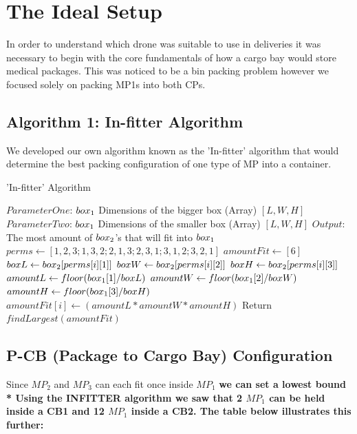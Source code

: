\documentclass[a4paper,12pt]{article}
\begin{document}
\section{The Ideal Setup}

In order to understand which drone was suitable to use in deliveries it was necessary to begin with the core fundamentals
of how a cargo bay would store medical packages. This was noticed to be a bin packing problem however we focused solely on packing MP1s into both CPs.

\subsection{Algorithm 1: In-fitter Algorithm}
We developed our own algorithm known as the 'In-fitter' algorithm that would determine the best packing configuration of one type of MP into a container.

\begin{algorithm}
  \caption{'In-fitter' Algorithm }
  \label{array-sum}
  \begin{algorithmic}[1]
    \State $ParameterOne$: $box\textsubscript{1}$ Dimensions of the bigger box (Array) $[L, W, H]$
    \State $ParameterTwo$: $box\textsubscript{1}$ Dimensions of the smaller box (Array) $[L, W, H]$
    \State $Output$: The most amount of $box\textsubscript{2}$'s that will fit into $box\textsubscript{1}$
    \State
    \State $perms \leftarrow [1,2,3;1,3,2;2,1,3;2,3,1;3,1,2;3,2,1]$
    \State $amountFit \leftarrow [6] $
    \State $boxL \leftarrow box\textsubscript{2}[perms[i][1]] $ 
    \State $boxW \leftarrow box\textsubscript{2}[perms[i][2]] $
    \State $boxH \leftarrow box\textsubscript{2}[perms[i][3]] $
    \State
    \State $amountL \leftarrow floor( box\textsubscript{1}[1]/boxL )$
    \State $amountW \leftarrow floor( box\textsubscript{1}[2]/boxW )$
    \State $amountH \leftarrow floor( box\textsubscript{1}[3]/boxH )$
    \State $amountFit[i] \leftarrow (amountL * amountW * amountH)$
    \EndFor
    \State Return $findLargest(amountFit)$
    \EndProcedure
  \end{algorithmic}
\end{algorithm}


\subsection{P-CB (Package to Cargo Bay) Configuration}
Since $MP_2$ and $MP_3$ can each fit once inside $MP_1$ \bf{we can set a lowest bound} \\*
Using the INFITTER algorithm we saw that 2 $MP_1$ can be held inside a CB1 and 12 $MP_1$ inside a CB2.  The table below illustrates this further:
\end{document}
